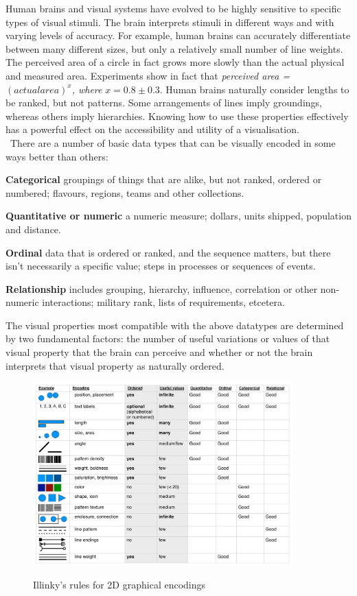 \documentclass[a4paper,11pt,titlepage]{article}
\begin{document}
  		 Human brains and visual systems have evolved to be highly sensitive to specific types of visual stimuli. The brain interprets stimuli in different ways and with varying levels of accuracy. For example, human brains can accurately differentiate between many different sizes, but only a relatively small number of line weights. The perceived area of a circle in fact grows more slowly than the actual physical and measured area. Experiments \cite{Meihoefer1973} show in fact that \textit{perceived area = $(actual area)^{x}$, where} $ x= 0.8 \pm 0.3 $. Human brains naturally consider lengths to be ranked, but not patterns. Some arrangements of lines imply groundings, whereas others imply hierarchies. Knowing how to use these properties effectively has a powerful effect on the accessibility and utility of a visualisation.\cite{Iliinsky2013}
		\\\
		There are a number of basic data types that can be visually encoded in some ways better than others:
		\par 
		\textbf{Categorical} groupings of things that are alike, but not ranked, ordered or numbered; flavours, regions, teams and other collections. 
		\par 
		\textbf{Quantitative or numeric} a numeric measure; dollars, units shipped, population and distance. 
		\par 
		\textbf{Ordinal} data that is ordered or ranked, and the sequence matters, but there isn't necessarily a specific value; steps in processes or sequences of events. 
		\par 
		\textbf{Relationship} includes grouping, hierarchy, influence, correlation or other non-numeric interactions; military rank, lists of requirements, etcetera. 
		\par 
		The visual properties most compatible with the above datatypes are determined by two fundamental factors: the number of useful variations or values of that visual property that the brain can perceive and whether or not the brain interprets that visual property as naturally ordered. 
				
		\begin{figure}[H]
    			\centering	
			{{\includegraphics[width=10cm]
    				{img/noah_illinsky_visual_encodings.png} 
    			}}%
    			\caption{Illinky's rules for 2D graphical encodings}%
    			\label{fig:illinsky}
		\end{figure}
		
\end{document}
